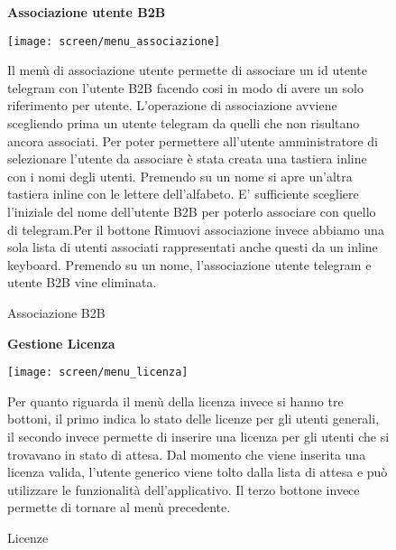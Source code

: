 \begin{figure}[h!]
   \begin{center}
   \textbf{Associazione utente B2B}\\
   \end{center}
   \begin{center}
    \texttt{[image: screen/menu\_associazione]} 
    \caption{Associazione B2B}
    \end{center}
     Il menù di associazione utente permette di associare un id utente telegram con l'utente B2B facendo cosi in modo di avere un solo riferimento per utente. L'operazione di associazione avviene scegliendo prima un utente telegram da quelli che non risultano ancora associati. Per poter permettere all'utente amministratore di selezionare l'utente da associare è stata creata una tastiera inline con i nomi degli utenti. Premendo su un nome  si apre un'altra tastiera inline con le lettere dell'alfabeto. E’ sufficiente scegliere l'iniziale del nome dell'utente B2B per poterlo associare con quello di telegram.Per il bottone Rimuovi associazione invece abbiamo una sola lista di utenti associati rappresentati anche questi da un inline keyboard. Premendo su un nome, l'associazione utente telegram e utente B2B vine eliminata. 

\end{figure}  



\begin{figure}[h!]
   \begin{center}
   \textbf{Gestione Licenza}\\
   \end{center}
   \begin{center}
    \texttt{[image: screen/menu\_licenza]} 
    \caption{Licenze}
    \end{center}
   Per quanto riguarda il menù della licenza invece si hanno tre bottoni, il primo indica lo stato delle licenze per gli utenti generali, il secondo invece permette di inserire una licenza per gli utenti che si trovavano in stato di attesa. Dal momento che viene inserita una licenza valida, l'utente generico viene tolto dalla lista di attesa e può utilizzare le funzionalità dell'applicativo. Il terzo bottone invece permette di tornare al menù precedente.

\end{figure}  





